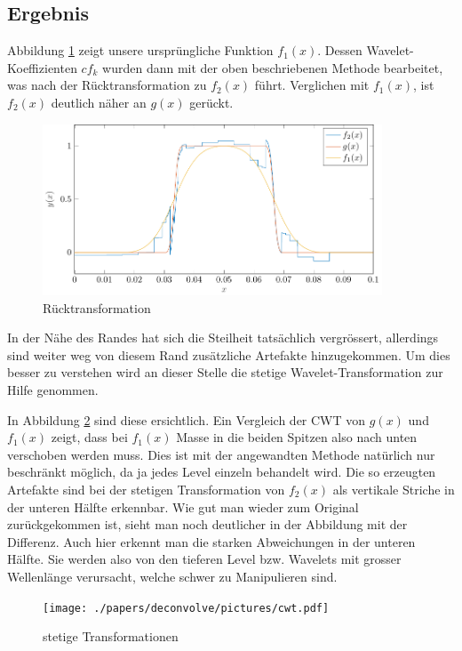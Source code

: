 \subsection{Ergebnis}
Abbildung \ref{deconvolve:result_1d} zeigt unsere ursprüngliche Funktion $f_1(x)$.
Dessen Wavelet-Koeffizienten $cf_k$ wurden dann mit der oben beschriebenen Methode bearbeitet, was nach der Rücktransformation zu $f_2(x)$ führt.
Verglichen mit $f_1(x)$, ist $f_2(x)$ deutlich näher an $g(x)$ gerückt.
\begin{figure}[h]
\centering
\includegraphics[width=0.9\textwidth]{./papers/deconvolve/pictures/result_1d.pdf}
\caption{Rücktransformation\label{deconvolve:result_1d}}
\end{figure}

In der Nähe des Randes hat sich die Steilheit tatsächlich vergrössert, allerdings sind weiter weg von diesem Rand zusätzliche Artefakte hinzugekommen.
Um dies besser zu verstehen wird an dieser Stelle die stetige Wavelet-Transformation zur Hilfe genommen.

In Abbildung \ref{deconvolve:cwt} sind diese ersichtlich.
Ein Vergleich der CWT von $g(x)$ und $f_1(x)$ zeigt, dass bei $f_1(x)$ \glqq Masse\grqq{} in die beiden Spitzen also nach unten verschoben werden muss.
Dies ist mit der angewandten Methode natürlich nur beschränkt möglich, da ja jedes Level einzeln behandelt wird.
Die so erzeugten Artefakte sind bei der stetigen Transformation von $f_2(x)$ als vertikale Striche in der unteren Hälfte erkennbar.
Wie gut man wieder zum Original zurückgekommen ist, sieht man noch deutlicher in der Abbildung mit der Differenz.
Auch hier erkennt man die starken Abweichungen in der unteren Hälfte.
Sie werden also von den tieferen Level bzw. Wavelets mit grosser \glqq Wellenlänge\grqq{} verursacht, welche schwer zu Manipulieren sind.
\begin{figure}[h]
\centering
\texttt{[image: ./papers/deconvolve/pictures/cwt.pdf]}
\caption{stetige Transformationen\label{deconvolve:cwt}}
\end{figure}

